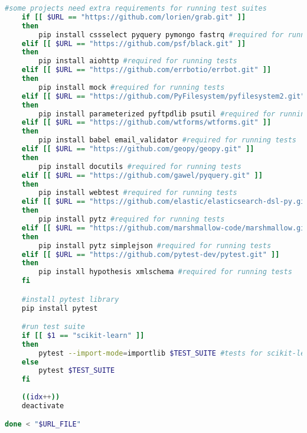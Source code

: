 \begin{lstlisting}[caption=Bash Script for Project Selection,label=code:project_selection_automation.sh,language=Bash]
    #some projects need extra requirements for running test suites
    if [[ $URL == "https://github.com/lorien/grab.git" ]]
    then
        pip install cssselect pyquery pymongo fastrq #required for running tests
    elif [[ $URL == "https://github.com/psf/black.git" ]]
    then
        pip install aiohttp #required for running tests
    elif [[ $URL == "https://github.com/errbotio/errbot.git" ]]
    then
        pip install mock #required for running tests
    elif [[ $URL == "https://github.com/PyFilesystem/pyfilesystem2.git" ]]
    then
        pip install parameterized pyftpdlib psutil #required for running tests
    elif [[ $URL == "https://github.com/wtforms/wtforms.git" ]]
    then
        pip install babel email_validator #required for running tests
    elif [[ $URL == "https://github.com/geopy/geopy.git" ]]
    then
        pip install docutils #required for running tests
    elif [[ $URL == "https://github.com/gawel/pyquery.git" ]]
    then
        pip install webtest #required for running tests
    elif [[ $URL == "https://github.com/elastic/elasticsearch-dsl-py.git" ]]
    then
        pip install pytz #required for running tests
    elif [[ $URL == "https://github.com/marshmallow-code/marshmallow.git" ]]
    then
        pip install pytz simplejson #required for running tests
    elif [[ $URL == "https://github.com/pytest-dev/pytest.git" ]]
    then
        pip install hypothesis xmlschema #required for running tests
    fi

    #install pytest library
    pip install pytest

    #run test suite
    if [[ $1 == "scikit-learn" ]]
    then
        pytest --import-mode=importlib $TEST_SUITE #tests for scikit-learn need importlib to locate conftest
    else
        pytest $TEST_SUITE
    fi
    
    ((idx++))
    deactivate

done < "$URL_FILE"
\end{lstlisting}
